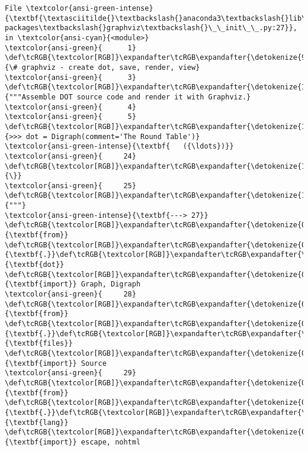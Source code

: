 \documentclass[11pt]{article}
\begin{document}
\begin{Verbatim}[commandchars=\\\{\}, frame=single, framerule=2mm, rulecolor=\color{outerrorbackground}]
File \textcolor{ansi-green-intense}{\textbf{\textasciitilde{}\textbackslash{}anaconda3\textbackslash{}lib\textbackslash{}site-packages\textbackslash{}graphviz\textbackslash{}\_\_init\_\_.py:27}}, in \textcolor{ansi-cyan}{<module>}
\textcolor{ansi-green}{      1} \def\tcRGB{\textcolor[RGB]}\expandafter\tcRGB\expandafter{\detokenize{95,135,135}}{\# graphviz - create dot, save, render, view}
\textcolor{ansi-green}{      3} \def\tcRGB{\textcolor[RGB]}\expandafter\tcRGB\expandafter{\detokenize{175,0,0}}{"""Assemble DOT source code and render it with Graphviz.}
\textcolor{ansi-green}{      4} 
\textcolor{ansi-green}{      5} \def\tcRGB{\textcolor[RGB]}\expandafter\tcRGB\expandafter{\detokenize{175,0,0}}{>>> dot = Digraph(comment='The Round Table')}
\textcolor{ansi-green-intense}{\textbf{   ({\ldots})}}
\textcolor{ansi-green}{     24} \def\tcRGB{\textcolor[RGB]}\expandafter\tcRGB\expandafter{\detokenize{175,0,0}}{\}}
\textcolor{ansi-green}{     25} \def\tcRGB{\textcolor[RGB]}\expandafter\tcRGB\expandafter{\detokenize{175,0,0}}{"""}
\textcolor{ansi-green-intense}{\textbf{---> 27}} \def\tcRGB{\textcolor[RGB]}\expandafter\tcRGB\expandafter{\detokenize{0,135,0}}{\textbf{from}} \def\tcRGB{\textcolor[RGB]}\expandafter\tcRGB\expandafter{\detokenize{0,0,255}}{\textbf{.}}\def\tcRGB{\textcolor[RGB]}\expandafter\tcRGB\expandafter{\detokenize{0,0,255}}{\textbf{dot}} \def\tcRGB{\textcolor[RGB]}\expandafter\tcRGB\expandafter{\detokenize{0,135,0}}{\textbf{import}} Graph, Digraph
\textcolor{ansi-green}{     28} \def\tcRGB{\textcolor[RGB]}\expandafter\tcRGB\expandafter{\detokenize{0,135,0}}{\textbf{from}} \def\tcRGB{\textcolor[RGB]}\expandafter\tcRGB\expandafter{\detokenize{0,0,255}}{\textbf{.}}\def\tcRGB{\textcolor[RGB]}\expandafter\tcRGB\expandafter{\detokenize{0,0,255}}{\textbf{files}} \def\tcRGB{\textcolor[RGB]}\expandafter\tcRGB\expandafter{\detokenize{0,135,0}}{\textbf{import}} Source
\textcolor{ansi-green}{     29} \def\tcRGB{\textcolor[RGB]}\expandafter\tcRGB\expandafter{\detokenize{0,135,0}}{\textbf{from}} \def\tcRGB{\textcolor[RGB]}\expandafter\tcRGB\expandafter{\detokenize{0,0,255}}{\textbf{.}}\def\tcRGB{\textcolor[RGB]}\expandafter\tcRGB\expandafter{\detokenize{0,0,255}}{\textbf{lang}} \def\tcRGB{\textcolor[RGB]}\expandafter\tcRGB\expandafter{\detokenize{0,135,0}}{\textbf{import}} escape, nohtml


\end{Verbatim}
\end{document}
